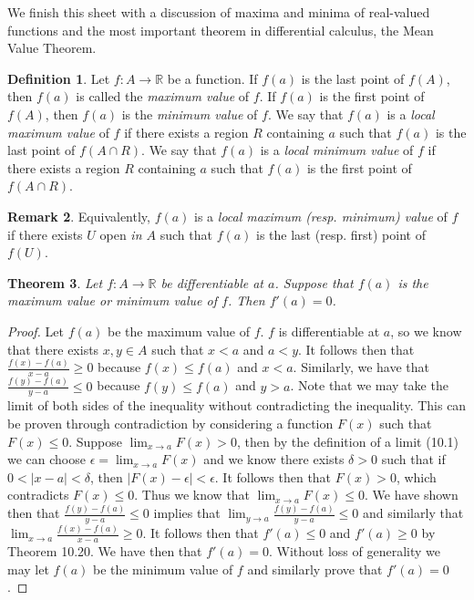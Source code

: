 \documentclass[12pt]{article}
\newcommand{\bbR}{\mathbb{R}}
\providecommand{\abs}[1]{\lvert #1 \rvert}
\providecommand{\sarr}{\rightarrow}
\providecommand{\arr}{\longrightarrow}
\renewcommand{\_}[1]{\underline{ #1 }}
\newtheorem{theorem}{Theorem}[section]
\theoremstyle{definition}
\newtheorem{definition}[theorem]{Definition}
\newtheorem{remark}[theorem]{Remark}
\numberwithin{equation}{subsection}
\begin{document}
We finish this sheet with a discussion of maxima and minima of real-valued functions and 
the most important theorem in differential calculus, the Mean Value Theorem.

\begin{definition} Let $f \colon A \arr \bbR$ be a function.  If $f(a)$ is the last point of $f(A)$, then $f(a)$ is called the \emph{maximum value} of $f$.  If $f(a)$ is the first point of $f(A)$, then $f(a)$ is the \emph{minimum value} of $f$.  We say that $f(a)$ is a \emph{local maximum value} of $f$ if there exists a region $R$ containing $a$ such that $f(a)$ is the last point of $f(A \cap R)$.  We say that $f(a)$ is a \emph{local minimum value} of $f$ if there exists a region $R$ containing $a$ such that $f(a)$ is the first point of $f(A \cap R)$.
\end{definition}

\begin{remark}
Equivalently, $f(a)$ is a \emph{local maximum (resp. minimum) value} of $f$ if there exists $U$ open \emph{in $A$} such that $f(a)$ is the last (resp. first) point of $f(U)$.
\end{remark}


\begin{theorem}  
Let $f:A \arr \bbR$ be differentiable at $a$.  Suppose that $f(a)$ is the maximum value or minimum value of $f$.  Then $f'(a) = 0$.
\end{theorem}

\begin{proof}
Let $f(a)$ be the maximum value of $f$. $f$ is differentiable at $a$, so we know that there exists $x,y \in A$ such that $x < a$ and $a < y$. It follows then that $\frac{f(x)-f(a)}{x-a} \geq 0$ because $f(x) \leq f(a)$ and $x < a$. Similarly, we have that $\frac{f(y)-f(a)}{y-a} \leq 0$ because $f(y) \leq f(a)$ and $y > a$. \newline
Note that we may take the limit of both sides of the inequality without contradicting the inequality. This can be proven through contradiction by considering a function $F(x)$ such that $F(x) \leq 0$. Suppose $\lim_{x \sarr a} F(x) > 0$, then by the definition of a limit (10.1) we can choose $\epsilon = \lim_{x \sarr a} F(x)$ and we know there exists $\delta > 0$ such that if $0 < \abs{x-a} < \delta$, then $\abs{F(x) - \epsilon} < \epsilon$. It follows then that $F(x) > 0$, which contradicts $F(x) \leq 0$. Thus we know that $\lim_{x \sarr a} F(x) \leq 0$. \newline
We have shown then that $\frac{f(y) - f(a)}{y-a} \leq 0$ implies that $\lim_{y \sarr a} \frac{f(y)-f(a)}{y-a} \leq 0$ and similarly that $\lim_{x \sarr a} \frac{f(x)-f(a)}{x-a} \geq 0$. It follows then that $f'(a) \leq 0$ and $f'(a) \geq 0$ by Theorem 10.20. We have then that $f'(a) = 0$. \newline
Without loss of generality we may let $f(a)$ be the minimum value of $f$ and similarly prove that $f'(a) = 0$.
\end{proof}
\end{document}
